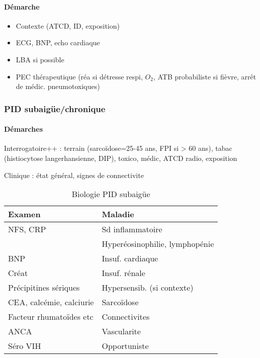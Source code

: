 \documentclass[11pt]{article}
\begin{document}
\paragraph{Démarche}
\label{sec:orge3f458a}

\begin{itemize}
\item Contexte (ATCD, ID, exposition)
\item ECG, BNP, echo cardiaque
\item LBA si possible
\item PEC thérapeutique (réa si détresse respi, \(O_2\), ATB probabiliste si fièvre, arrêt de médic. pneumotoxiques)
\end{itemize}


\subsubsection{PID subaigüe/chronique}
\label{sec:org933f2ab}
\paragraph{Démarches}
\label{sec:org5dabf66}
Interrogatoire++ : terrain (sarcoïdose=25-45 ans, \gls{FPI} si > 60 ans), tabac (histiocytose langerhansienne, \gls{DIP}), toxico, médic, ATCD radio, exposition

Clinique : état général, signes de connectivite

\begin{table}[htbp]
  \caption{Biologie PID subaigüe}
  \centering
  \begin{tabular}{ll}
    \toprule
    Examen & Maladie\\
    \midrule
    NFS, CRP & Sd inflammatoire\\
           & Hyperéosinophilie, lymphopénie\\
    BNP & Insuf. cardiaque\\
    Créat & Insuf. rénale\\
    Précipitines sériques & Hypersensib. (si contexte)\\
    CEA, calcémie, calciurie & Sarcoïdose\\
    Facteur rhumatoïdes etc & Connectivites\\
    ANCA & Vascularite\\
    Séro VIH & Opportuniste\\
    \bottomrule
  \end{tabular}
\end{table}
\end{document}
